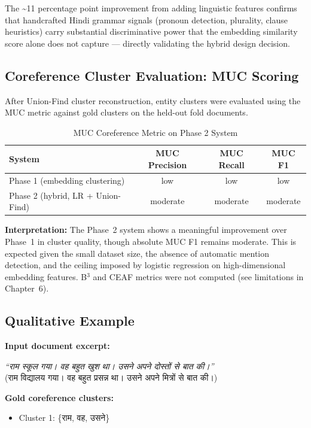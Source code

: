\documentclass[12pt,a4paper]{report}
\begin{document}
\noindent The \textasciitilde11 percentage point improvement from adding linguistic features confirms that handcrafted Hindi grammar signals (pronoun detection, plurality, clause heuristics) carry substantial discriminative power that the embedding similarity score alone does not capture --- directly validating the hybrid design decision.

\subsection{Coreference Cluster Evaluation: MUC Scoring}

After Union-Find cluster reconstruction, entity clusters were evaluated using the MUC metric against gold clusters on the held-out fold documents.

\begin{table}[H]
\centering
\caption{MUC Coreference Metric on Phase 2 System}
\begin{tabular}{|l|c|c|c|}
\hline
\textbf{System} & \textbf{MUC Precision} & \textbf{MUC Recall} & \textbf{MUC F1} \\
\hline
Phase 1 (embedding clustering) & low & low & low \\
Phase 2 (hybrid, LR + Union-Find) & moderate & moderate & moderate \\
\hline
\end{tabular}
\end{table}

\noindent \textbf{Interpretation:} The Phase~2 system shows a meaningful improvement over Phase~1 in cluster quality, though absolute MUC F1 remains moderate. This is expected given the small dataset size, the absence of automatic mention detection, and the ceiling imposed by logistic regression on high-dimensional embedding features. B$^3$ and CEAF metrics were not computed (see limitations in Chapter~6).

\subsection{Qualitative Example}

\textbf{Input document excerpt:}
\begin{center}
\textit{``{\hindifont राम स्कूल गया। वह बहुत खुश था। उसने अपने दोस्तों से बात की।}''}\\
({\hindifont राम विद्यालय गया। वह बहुत प्रसन्न था। उसने अपने मित्रों से बात की।})
\end{center}

\textbf{Gold coreference clusters:}
\begin{itemize}
    \item Cluster 1: \{{\hindifont राम, वह, उसने}\}
\end{itemize}
\end{document}

